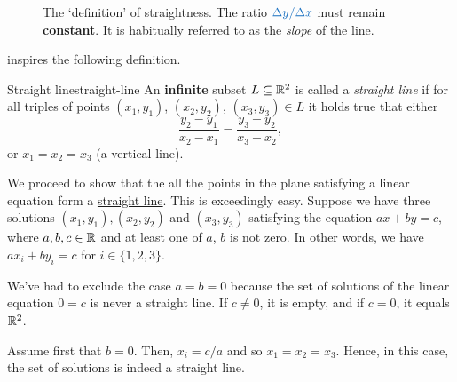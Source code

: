 \begin{figure}[ht]
 \centering
 \caption{The `definition' of straightness. The ratio $\clb{\Delta y / \Delta
  x}$ must remain \textbf{constant}. It is habitually referred to as the
  \emph{slope} of the line.}
 \label{fig:straight-line}
\end{figure}

 inspires the following definition.

\begin{definition}{Straight line}{straight-line}
 An \textbf{infinite} subset $L \subseteq \mathbb{R}^2$ is called a \emph{straight line}
 if for all triples of points $(x_1,y_1)$, $(x_2,y_2)$, $(x_3,y_3) \in L$ it
 holds true that either
 \begin{equation}
  \label{eq:straight-line}
  \frac{y_2 - y_1}{x_2 - x_1} = \frac{y_3 - y_2}{x_3 - x_2},
 \end{equation}
 or $x_1 = x_2 = x_3$ (a vertical line).
\end{definition}

We proceed to show that the all the points in the plane satisfying a linear
equation form a \hyperref[def:straight-line]{straight line}. This is exceedingly
easy. Suppose we have three solutions $(x_1,y_1),(x_2,y_2)$ and $(x_3,y_3)$
satisfying the equation $ax + by = c$, where $a,b,c \in \mathbb{R}$ and at least one of
$a$, $b$ is not zero. In other words, we have $ax_i + by_i = c$ for $i \in
\{1,2,3\}$.

We've had to exclude the case $a = b = 0$ because the set of solutions of the
linear equation $0 = c$ is never a straight line. If $c \neq 0$, it is empty,
and if $c = 0$, it equals $\mathbb{R}^2$.

Assume first that $b = 0$. Then, $x_i = c / a$ and so $x_1 = x_2 = x_3$. Hence,
in this case, the set of solutions is indeed a straight line.

